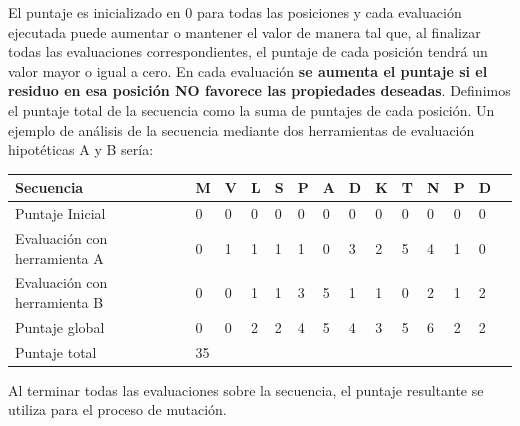 El puntaje es inicializado en 0 para todas las posiciones y cada evaluación ejecutada puede aumentar o mantener el valor de manera tal que, 
al finalizar todas las evaluaciones correspondientes, el puntaje de cada posición tendrá un valor mayor o igual a cero.
En cada evaluación \textbf{se aumenta el puntaje si el residuo en esa posición NO favorece las propiedades deseadas}.
Definimos el puntaje total de la secuencia como la suma de puntajes de cada posición.
Un ejemplo de análisis de la secuencia mediante dos herramientas de evaluación hipotéticas A y B sería: %

\vspace{0.3cm}
\begin{tabular}{llllllllllllll} 
\hline
Secuencia & \textbf{M} & \textbf{V} & \textbf{L} & \textbf{S} & \textbf{P} & \textbf{A} & \textbf{D} & \textbf{K} & \textbf{T} & \textbf{N} & \textbf{P} & \textbf{D} \\ \hline
Puntaje Inicial & 0 & 0 & 0 & 0 & 0 & 0 & 0 & 0 & 0 & 0 & 0 & 0\\ \hline
Evaluación con herramienta A & 0 & 1 & 1 & 1 & 1 & 0 & 3 & 2 & 5 & 4 & 1 & 0\\ \hline
Evaluación con herramienta B & 0 & 0 & 1 & 1 & 3 & 5 & 1 & 1 & 0 & 2 & 1 & 2\\ \hline
Puntaje global & 0 & 0 & 2 & 2 & 4 & 5 & 4 & 3 & 5 & 6 & 2 & 2\\ \hline
Puntaje total  & 35 \\ \hline
\end{tabular}

\vspace{0.5cm}


Al terminar todas las evaluaciones sobre la secuencia, el puntaje resultante se utiliza para el proceso de mutación.


